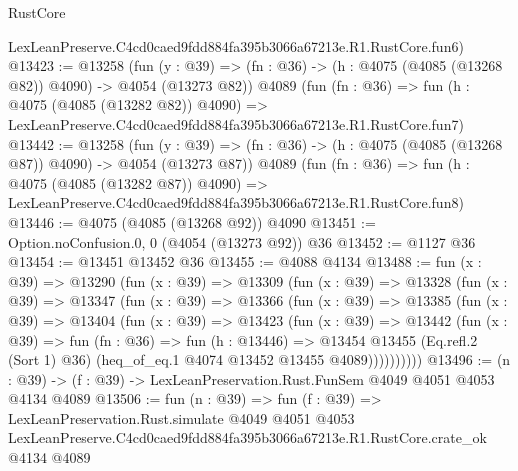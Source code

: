 \begin{lexlean}{RustCore}
\begin{coremodule}
    LexLeanPreserve.C4cd0caed9fdd884fa395b3066a67213e.R1.RustCore.fun6)
@13423 := @13258
    (fun (y : @39) => (fn : @36) -> (h : @4075 (@4085 (@13268 @82)) @4090) -> @4054 (@13273 @82))
    @4089
    (fun (fn : @36) =>
    fun (h : @4075 (@4085 (@13282 @82)) @4090) =>
    LexLeanPreserve.C4cd0caed9fdd884fa395b3066a67213e.R1.RustCore.fun7)
@13442 := @13258
    (fun (y : @39) => (fn : @36) -> (h : @4075 (@4085 (@13268 @87)) @4090) -> @4054 (@13273 @87))
    @4089
    (fun (fn : @36) =>
    fun (h : @4075 (@4085 (@13282 @87)) @4090) =>
    LexLeanPreserve.C4cd0caed9fdd884fa395b3066a67213e.R1.RustCore.fun8)
@13446 := @4075 (@4085 (@13268 @92)) @4090
@13451 := Option.noConfusion.{0, 0} (@4054 (@13273 @92)) @36
@13452 := @1127 @36
@13454 := @13451 @13452 @36
@13455 := @4088 @4134
@13488 := fun (x : @39) =>
  @13290
    (fun (x : @39) =>
    @13309
      (fun (x : @39) =>
      @13328
        (fun (x : @39) =>
        @13347
          (fun (x : @39) =>
          @13366
            (fun (x : @39) =>
            @13385
              (fun (x : @39) =>
              @13404
                (fun (x : @39) =>
                @13423
                  (fun (x : @39) =>
                  @13442
                    (fun (x : @39) =>
                    fun (fn : @36) =>
                    fun (h : @13446) =>
                    @13454
                      @13455
                      (Eq.refl.{2} (Sort 1) @36)
                      (heq_of_eq.{1} @4074 @13452 @13455 @4089))))))))))
@13496 := (n : @39) -> (f : @39) -> LexLeanPreservation.Rust.FunSem @4049 @4051 @4053 @4134 @4089
@13506 := fun (n : @39) =>
  fun (f : @39) =>
  LexLeanPreservation.Rust.simulate
    @4049
    @4051
    @4053
    LexLeanPreserve.C4cd0caed9fdd884fa395b3066a67213e.R1.RustCore.crate_ok
    @4134
    @4089
\end{coremodule}
\end{lexlean}
